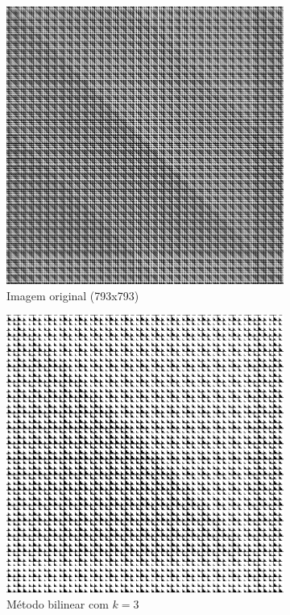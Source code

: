 \documentclass[leqno]{article}
\begin{document}
\begin{figure}[H]
    \centering
    \begin{subfigure}{.33\textwidth}
      \centering
      \includegraphics[width=.7\linewidth]{../images/func_2.png}
      \caption{Imagem original  (793x793) }
      \label{fig:sub1}
    \end{subfigure}%
    \begin{subfigure}{.33\textwidth}
      \centering
      \includegraphics[width=.7\linewidth]{../images/func_2_bil.png}
      \caption{Método bilinear com $k = 3$}
      \label{fig:sub2}
    \end{subfigure}
    \begin{subfigure}{.33\textwidth}
        \centering

\end{subfigure}
\end{figure}
\end{document}
